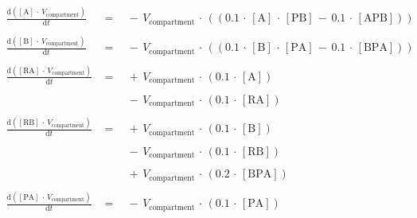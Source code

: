 
$$
\begin{array}{ccl}
\frac {\mathrm{d}\left( {{\mathrm{[A]}} \, \cdot \, {V}_{\mathrm{compartment}} } \right) }  {\mathrm{d}{t} }  \; &=& \;  { \, - \, {V}_{\mathrm{compartment}} \, \cdot \, \left(\left( {{0.1} \, \cdot \, {\mathrm{[A]}} \, \cdot \, {\mathrm{[PB]}} \, - \, {0.1} \, \cdot \, {\mathrm{[APB]}} } \right)\right) } \\ 
 && \\ 
\frac {\mathrm{d}\left( {{\mathrm{[B]}} \, \cdot \, {V}_{\mathrm{compartment}} } \right) }  {\mathrm{d}{t} }  \; &=& \;  { \, - \, {V}_{\mathrm{compartment}} \, \cdot \, \left(\left( {{0.1} \, \cdot \, {\mathrm{[B]}} \, \cdot \, {\mathrm{[PA]}} \, - \, {0.1} \, \cdot \, {\mathrm{[BPA]}} } \right)\right) } \\ 
 && \\ 
\frac {\mathrm{d}\left( {{\mathrm{[RA]}} \, \cdot \, {V}_{\mathrm{compartment}} } \right) }  {\mathrm{d}{t} }  \; &=& \;  { \, + \, {V}_{\mathrm{compartment}} \, \cdot \, \left( {{0.1} \, \cdot \, {\mathrm{[A]}} } \right) } \\ 
 && \\ 
 \; && \;  { \, - \, {V}_{\mathrm{compartment}} \, \cdot \, \left( {{0.1} \, \cdot \, {\mathrm{[RA]}} } \right) } \\ 
 && \\ 
\frac {\mathrm{d}\left( {{\mathrm{[RB]}} \, \cdot \, {V}_{\mathrm{compartment}} } \right) }  {\mathrm{d}{t} }  \; &=& \;  { \, + \, {V}_{\mathrm{compartment}} \, \cdot \, \left( {{0.1} \, \cdot \, {\mathrm{[B]}} } \right) } \\ 
 && \\ 
 \; && \;  { \, - \, {V}_{\mathrm{compartment}} \, \cdot \, \left( {{0.1} \, \cdot \, {\mathrm{[RB]}} } \right) } \\ 
 && \\ 
 \; && \;  { \, + \, {V}_{\mathrm{compartment}} \, \cdot \, \left( {{0.2} \, \cdot \, {\mathrm{[BPA]}} } \right) } \\ 
 && \\ 
\frac {\mathrm{d}\left( {{\mathrm{[PA]}} \, \cdot \, {V}_{\mathrm{compartment}} } \right) }  {\mathrm{d}{t} }  \; &=& \;  { \, - \, {V}_{\mathrm{compartment}} \, \cdot \, \left( {{0.1} \, \cdot \, {\mathrm{[PA]}} } \right) } \\ 

\end{array}$$
